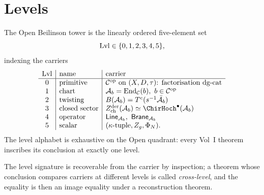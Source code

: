 \section{Levels}
\label{sec:type-levels}

\begin{definition}
\label{def:type-levels}
The Open Beilinson tower is the linearly ordered five-element set
\[
 \mathrm{Lvl}
 \in\{0,1,2,3,4,5\},
\]
indexing the carriers
\[
\begin{array}{c|l|l}
\BeilLevel & \text{name} & \text{carrier} \\
\hline
0 & \text{primitive} & \mathcal C^{\mathrm{op}}\text{ on }(X,D,\tau)\text{: factorisation dg-cat} \\
1 & \text{chart} & \Ab=\mathrm{End}_{\mathcal C}(b),\ b\in\mathcal C^{\mathrm{op}} \\
2 & \text{twisting} & B(\Ab)=T^c(s^{-1}\bar\Ab) \\
3 & \text{closed sector} & Z^{\mathrm{der}}_{\mathrm{ch}}(\Ab)\simeq\ChirHoch^\bullet(\Ab) \\
4 & \text{operator} & \mathsf{Line}_{\Ab},\ \mathsf{Brane}_{\Ab} \\
5 & \text{scalar} & (\kappa\text{-tuple},Z_g,\Phi_N).
\end{array}
\]
The level alphabet is exhaustive on the Open quadrant: every Vol~I
theorem inscribes its conclusion at exactly one level.
\end{definition}

The level signature is recoverable from the carrier by inspection;
a theorem whose conclusion compares carriers at different levels is
called \emph{cross-level}, and the equality is then an image
equality under a reconstruction theorem.

